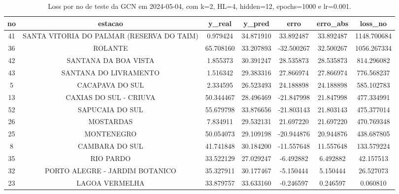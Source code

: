 \begin{table}[h]
\centering
\caption{Loss por no de teste da GCN em 2024-05-04, com k=2, HL=4, hidden=12, epochs=1000 e lr=0.001.}
\label{tab:gcn_loss_k2_hl4_h12_e1000_d20240504}
\begin{tabular}{ccccccc}
\toprule
no & estacao & y\_real & y\_pred & erro & erro\_abs & loss\_no \\
\midrule
41 & SANTA VITORIA DO PALMAR (RESERVA DO TAIM) & 0.979424 & 34.871910 & 33.892487 & 33.892487 & 1148.700684 \\
36 & ROLANTE & 65.708160 & 33.207893 & -32.500267 & 32.500267 & 1056.267334 \\
42 & SANTANA DA BOA VISTA & 1.855373 & 30.391247 & 28.535873 & 28.535873 & 814.296082 \\
43 & SANTANA DO LIVRAMENTO & 1.516342 & 29.383316 & 27.866974 & 27.866974 & 776.568237 \\
5 & CACAPAVA DO SUL & 2.334595 & 26.523493 & 24.188898 & 24.188898 & 585.102783 \\
13 & CAXIAS DO SUL - CRIUVA & 50.344467 & 28.496469 & -21.847998 & 21.847998 & 477.334991 \\
52 & SAPUCAIA DO SUL & 55.679798 & 33.876656 & -21.803143 & 21.803143 & 475.377014 \\
26 & MOSTARDAS & 7.834911 & 29.532131 & 21.697220 & 21.697220 & 470.769348 \\
25 & MONTENEGRO & 50.054073 & 29.109198 & -20.944876 & 20.944876 & 438.687805 \\
8 & CAMBARA DO SUL & 41.741848 & 30.184200 & -11.557648 & 11.557648 & 133.579224 \\
35 & RIO PARDO & 33.522129 & 27.029247 & -6.492882 & 6.492882 & 42.157513 \\
32 & PORTO ALEGRE - JARDIM BOTANICO & 35.327911 & 30.177467 & -5.150444 & 5.150444 & 26.527073 \\
23 & LAGOA VERMELHA & 33.879757 & 33.633160 & -0.246597 & 0.246597 & 0.060810 \\
\bottomrule
\end{tabular}
\end{table}
